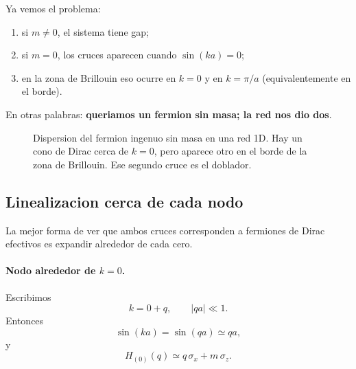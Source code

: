 Ya vemos el problema:

\begin{enumerate}[leftmargin=*]
  \item si \(m\neq 0\), el sistema tiene gap;
  \item si \(m=0\), los cruces aparecen cuando \(\sin(ka)=0\);
  \item en la zona de Brillouin eso ocurre en \(k=0\) y en \(k=\pi/a\) (equivalentemente en el borde).
\end{enumerate}

En otras palabras: \textbf{queriamos un fermion sin masa; la red nos dio dos}.

\begin{figure}[ht]
\centering
{}
\caption{Dispersion del fermion ingenuo sin masa en una red 1D. Hay un cono de Dirac cerca de \(k=0\), pero aparece otro en el borde de la zona de Brillouin. Ese segundo cruce es el doblador.}
\label{c26:fig:naive-1d-dispersion}
\end{figure}

\subsection{Linealizacion cerca de cada nodo}

La mejor forma de ver que ambos cruces corresponden a fermiones de Dirac efectivos es expandir alrededor de cada cero.

\paragraph{Nodo alrededor de \(k=0\).}
Escribimos
\begin{equation}
k = 0 + q,
\qquad |qa|\ll 1.
\end{equation}
Entonces
\begin{equation}
\sin(ka)=\sin(qa)\simeq qa,
\end{equation}
y
\begin{equation}
H_{(0)}(q)\simeq q\,\sigma_x + m\,\sigma_z.
\end{equation}

